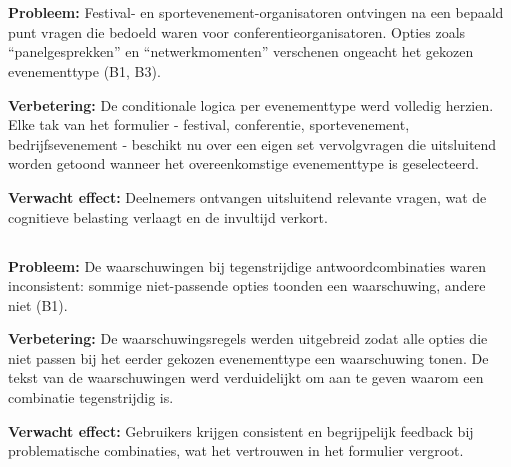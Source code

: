 \section{}

\subsection{}

\textbf{Probleem:} Festival- en sportevenement-organisatoren ontvingen na een bepaald punt vragen die bedoeld waren voor conferentieorganisatoren. Opties zoals ``panelgesprekken'' en ``netwerkmomenten'' verschenen ongeacht het gekozen evenementtype (B1, B3).

\textbf{Verbetering:} De conditionale logica per evenementtype werd volledig herzien. Elke tak van het formulier - festival, conferentie, sportevenement, bedrijfsevenement - beschikt nu over een eigen set vervolgvragen die uitsluitend worden getoond wanneer het overeenkomstige evenementtype is geselecteerd.

\textbf{Verwacht effect:} Deelnemers ontvangen uitsluitend relevante vragen, wat de cognitieve belasting verlaagt en de invultijd verkort.

\subsection{}

\textbf{Probleem:} De waarschuwingen bij tegenstrijdige antwoordcombinaties waren inconsistent: sommige niet-passende opties toonden een waarschuwing, andere niet (B1).

\textbf{Verbetering:} De waarschuwingsregels werden uitgebreid zodat alle opties die niet passen bij het eerder gekozen evenementtype een waarschuwing tonen. De tekst van de waarschuwingen werd verduidelijkt om aan te geven waarom een combinatie tegenstrijdig is.

\textbf{Verwacht effect:} Gebruikers krijgen consistent en begrijpelijk feedback bij problematische combinaties, wat het vertrouwen in het formulier vergroot.

\subsection{}

